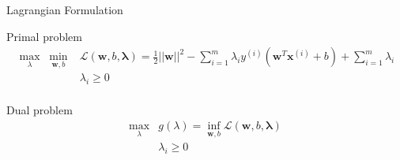 \documentclass{beamer}
\begin{document}
\begin{frame}{Lagrangian Formulation}
    \begin{block}{Primal problem}
        \begin{equation}
            \begin{array}{ll}
                \max\limits_\lambda \; \min\limits_{\mathbf{w}, b} &
                \mathcal{L} (\mathbf{w}, b, \mathbf{\lambda}) =
                \frac{1}{2} ||\mathbf{w}||^2 - \sum\limits^m_{i=1} \lambda_i y^{(i)}
                \left( \mathbf{w}^T \mathbf{x}^{(i)} + b \right) +
                \sum\limits^m_{i=1} \lambda_i\\[.2cm]
                & \lambda_i \ge 0 \\[.2cm]
            \end{array}
            \label{primal}
        \end{equation}
    \end{block}

    \begin{block}{Dual problem}
        \begin{equation}
            \begin{array}{ll}
                \max\limits_\lambda & g(\lambda) = \inf\limits_{\mathbf{w}, b}
                \mathcal{L} (\mathbf{w}, b, \mathbf{\lambda}) \\[.2cm]
                & \lambda_i \ge 0 \\[.2cm]
            \end{array}
            \label{g_lamb}
        \end{equation}
    \end{block}

\end{frame}
\end{document}
